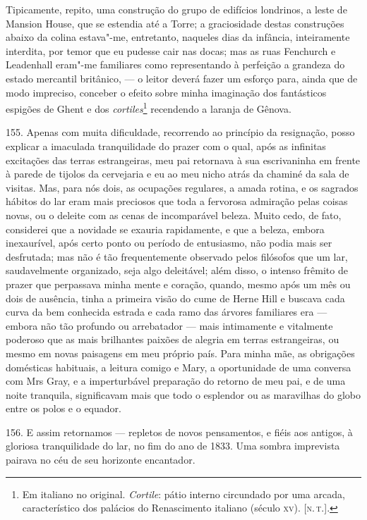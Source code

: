 Tipicamente, repito, uma construção do grupo de edifícios londrinos, a
leste de Mansion House, que se estendia até a Torre; a graciosidade
destas construções abaixo da colina estava"-me, entretanto, naqueles dias
da infância, inteiramente interdita, por temor que eu pudesse cair nas
docas; mas as ruas Fenchurch e Leadenhall eram"-me familiares como
representando à perfeição a grandeza do estado mercantil britânico, --- o
leitor deverá fazer um esforço para, ainda que de modo impreciso,
conceber o efeito sobre minha imaginação dos fantásticos espigões de
Ghent e dos \emph{cortiles}\footnote{Em italiano no original.
  \emph{Cortile}: pátio interno circundado por uma arcada,
  característico dos palácios do Renascimento italiano (século \textsc{xv}).
  {[}\textsc{n.\,t.}{]}.} recendendo a laranja de Gênova.

155. Apenas com muita dificuldade, recorrendo ao princípio da
resignação, posso explicar a imaculada tranquilidade do prazer com o
qual, após as infinitas excitações das terras estrangeiras, meu pai
retornava à sua escrivaninha em frente à parede de tijolos da cervejaria
e eu ao meu nicho atrás da chaminé da sala de visitas. Mas, para nós
dois, as ocupações regulares, a amada rotina, e os sagrados hábitos do
lar eram mais preciosos que toda a fervorosa admiração pelas coisas
novas, ou o deleite com as cenas de incomparável beleza. Muito cedo, de
fato, considerei que a novidade se exauria rapidamente, e que a beleza,
embora inexaurível, após certo ponto ou período de entusiasmo, não podia
mais ser desfrutada; mas não é tão frequentemente observado pelos
filósofos que um lar, saudavelmente organizado, seja algo deleitável;
além disso, o intenso frêmito de prazer que perpassava minha mente e
coração, quando, mesmo após um mês ou dois de ausência, tinha a primeira
visão do cume de Herne Hill e buscava cada curva da bem conhecida
estrada e cada ramo das árvores familiares era --- embora não tão
profundo ou arrebatador --- mais intimamente e vitalmente poderoso que as
mais brilhantes paixões de alegria em terras estrangeiras, ou mesmo em
novas paisagens em meu próprio país. Para minha mãe, as obrigações
domésticas habituais, a leitura comigo e Mary, a oportunidade de uma
conversa com Mrs Gray, e a imperturbável preparação do retorno de meu
pai, e de uma noite tranquila, significavam mais que todo o esplendor ou
as maravilhas do globo entre os polos e o equador.

156. E assim retornamos --- repletos de novos pensamentos, e fiéis aos
antigos, à gloriosa tranquilidade do lar, no fim do ano de 1833. Uma
sombra imprevista pairava no céu de seu horizonte encantador.

